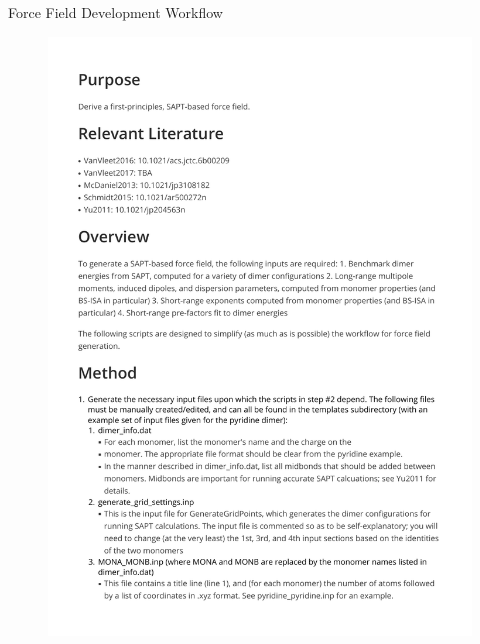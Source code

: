 \begin{chapter}{Force Field Development Workflow}

\begin{figure}
\centering
\includegraphics[page=1,width=1.0\textwidth]{workflow/github_readme.pdf}
\end{figure}
\begin{figure}\ContinuedFloat
\centering

\end{figure}
\end{chapter}
